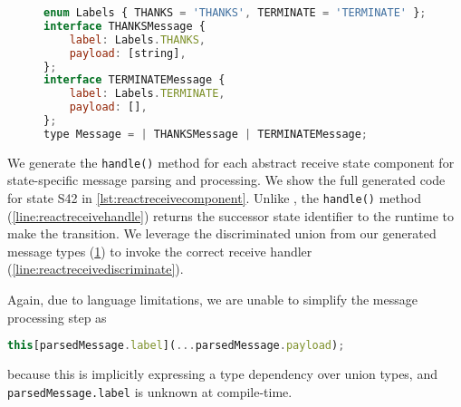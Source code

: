\begin{figure}[!h]
\begin{lstlisting}[language=javascript,tabsize=2]
enum Labels { THANKS = 'THANKS', TERMINATE = 'TERMINATE' };
interface THANKSMessage {
    label: Labels.THANKS,
    payload: [string],
};
interface TERMINATEMessage {
    label: Labels.TERMINATE,
    payload: [],
};
type Message = | THANKSMessage | TERMINATEMessage;
\end{lstlisting}
\label{lst:reactreceivetypes}
\end{figure}
	
We generate the \texttt{handle()} method for each
abstract receive state component for state-specific message
parsing and processing. We show the full generated code
for state S42 in \cref{lst:reactreceivecomponent}.
Unlike ,
the \texttt{handle()} method (\cref{line:reactreceivehandle})
returns the successor state identifier to the runtime
to make the transition.
We leverage the discriminated union from our
generated message types (\cref{lst:reactreceivetypes})
to invoke the correct receive handler (\cref{line:reactreceivediscriminate}).

Again, due to language limitations, we are unable to 
simplify the message processing step as

\begin{lstlisting}[language=javascript,numbers=none]
this[parsedMessage.label](...parsedMessage.payload);
\end{lstlisting}

because this is implicitly expressing a type dependency
over union types,
and \texttt{parsedMessage.label} is unknown at compile-time.


